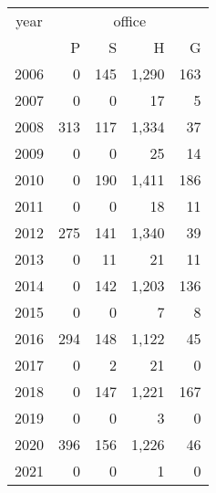 \footnotesize\begin{tabular}[t]{lrrrr}
\toprule
\multicolumn{1}{c}{year} & \multicolumn{4}{c}{office} \\
\cmidrule(l{3pt}r{3pt}){1-1} \cmidrule(l{3pt}r{3pt}){2-5}
  & P & S & H & G\\
\midrule
2006 & 0 & 145 & 1,290 & 163\\
2007 & 0 & 0 & 17 & 5\\
2008 & 313 & 117 & 1,334 & 37\\
2009 & 0 & 0 & 25 & 14\\
2010 & 0 & 190 & 1,411 & 186\\
2011 & 0 & 0 & 18 & 11\\
2012 & 275 & 141 & 1,340 & 39\\
2013 & 0 & 11 & 21 & 11\\
2014 & 0 & 142 & 1,203 & 136\\
2015 & 0 & 0 & 7 & 8\\
2016 & 294 & 148 & 1,122 & 45\\
2017 & 0 & 2 & 21 & 0\\
2018 & 0 & 147 & 1,221 & 167\\
2019 & 0 & 0 & 3 & 0\\
2020 & 396 & 156 & 1,226 & 46\\
2021 & 0 & 0 & 1 & 0\\
\bottomrule
\end{tabular}
